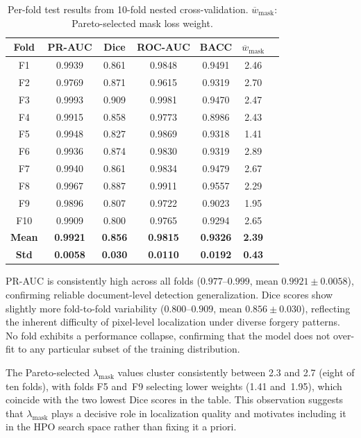 \begin{table}[!t]
  \centering
  \caption{Per-fold test results from 10-fold nested cross-validation.
           $\overline{w}_{\text{mask}}$: Pareto-selected mask loss weight.}
  \label{tab:nested_cv}
  \begin{tabular}{ccccccc}
    \toprule
    Fold & PR-AUC & Dice & ROC-AUC & BACC & $\overline{w}_{\text{mask}}$ \\
    \midrule
    F1  & 0.9939 & 0.861 & 0.9848 & 0.9491 & 2.46 \\
    F2  & 0.9769 & 0.871 & 0.9615 & 0.9319 & 2.70 \\
    F3  & 0.9993 & 0.909 & 0.9981 & 0.9470 & 2.47 \\
    F4  & 0.9915 & 0.858 & 0.9773 & 0.8986 & 2.43 \\
    F5  & 0.9948 & 0.827 & 0.9869 & 0.9318 & 1.41 \\
    F6  & 0.9936 & 0.874 & 0.9830 & 0.9319 & 2.89 \\
    F7  & 0.9940 & 0.861 & 0.9834 & 0.9479 & 2.67 \\
    F8  & 0.9967 & 0.887 & 0.9911 & 0.9557 & 2.29 \\
    F9  & 0.9896 & 0.807 & 0.9722 & 0.9023 & 1.95 \\
    F10 & 0.9909 & 0.800 & 0.9765 & 0.9294 & 2.65 \\
    \midrule
    \textbf{Mean} & \textbf{0.9921} & \textbf{0.856} & \textbf{0.9815} & \textbf{0.9326} & \textbf{2.39} \\
    \textbf{Std}  & \textbf{0.0058} & \textbf{0.030} & \textbf{0.0110} & \textbf{0.0192} & \textbf{0.43} \\
    \bottomrule
  \end{tabular}
\end{table}

PR-AUC is consistently high across all folds ($0.977$--$0.999$, mean
$0.9921 \pm 0.0058$), confirming reliable document-level detection generalization.
Dice scores show slightly more fold-to-fold variability ($0.800$--$0.909$, mean
$0.856 \pm 0.030$), reflecting the inherent difficulty of pixel-level localization
under diverse forgery patterns. No fold exhibits a performance collapse, confirming
that the model does not over-fit to any particular subset of the training
distribution.

The Pareto-selected $\lambda_{\text{mask}}$ values cluster consistently between
2.3 and 2.7 (eight of ten folds), with folds F5 and~F9 selecting lower weights
(1.41 and~1.95), which coincide with the two lowest Dice scores in the table.
This observation suggests that $\lambda_{\text{mask}}$ plays a decisive role in
localization quality and motivates including it in the HPO search space rather
than fixing it a priori.

